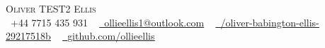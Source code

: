 \documentclass[letterpaper,11pt]{article}
\newcommand{\resumeSubHeadingListStart}{\begin{itemize}[leftmargin=0.0in, label={}]}
\newcommand{\resumeSubHeadingListEnd}{\end{itemize}}
\begin{document}

\begin{center}
    {\Huge \scshape Oliver TEST2 Ellis} \\ \vspace{1pt}
    \vspace{3mm}  %
    \small \raisebox{-0.1\height}\faPhone\ +44 7715 435 931 ~ \href{mailto:ollieellis1@outlook.com}{\raisebox{-0.2\height}\faEnvelope\  \underline{ollieellis1@outlook.com}} ~ 
    \href{https://www.linkedin.com/in/oliver-babington-ellis-29217518b/}{\raisebox{-0.2\height}\faLinkedin\ \underline{/oliver-babington-ellis-29217518b}}  ~
    \href{https://github.com/ollieellis}{\raisebox{-0.2\height}\faGithub\ \underline{github.com/ollieellis}}
    \vspace{-8pt}
\end{center}

\end{document}
